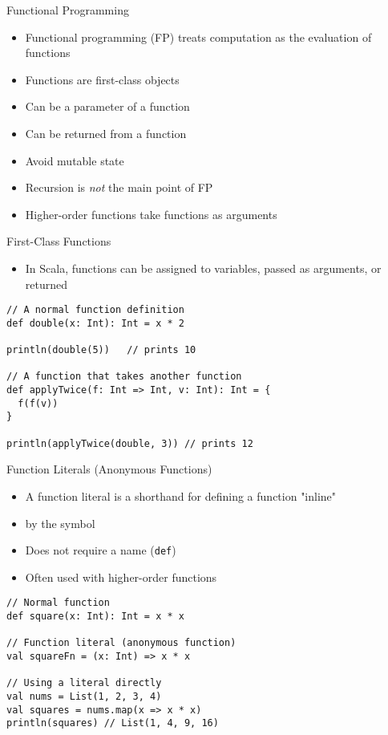 \begin{frame}[fragile]{Functional Programming}
\begin{itemize}
\item Functional programming (FP) treats computation as the evaluation of functions
\item Functions are first-class objects
\item Can be a parameter of a function
\item Can be returned from a function
\item Avoid mutable state
\item Recursion is \emph{not} the main point of FP
\item Higher-order functions take functions as arguments
\end{itemize}
\end{frame}


\begin{frame}[fragile]{First-Class Functions}
\begin{itemize}
    \item In Scala, functions can be assigned to variables, passed as arguments, or returned
\end{itemize}

\begin{verbatim}
// A normal function definition
def double(x: Int): Int = x * 2

println(double(5))   // prints 10

// A function that takes another function
def applyTwice(f: Int => Int, v: Int): Int = {
  f(f(v))
}

println(applyTwice(double, 3)) // prints 12
\end{verbatim}
\end{frame}

\begin{frame}[fragile]{Function Literals (Anonymous Functions)}
\begin{itemize}
    \item A function literal is a shorthand for defining a function "inline"
    \item by the \code{=>} symbol
    \item Does not require a name (\texttt{def})
    \item Often used with higher-order functions
\end{itemize}

\begin{verbatim}
// Normal function
def square(x: Int): Int = x * x

// Function literal (anonymous function)
val squareFn = (x: Int) => x * x

// Using a literal directly
val nums = List(1, 2, 3, 4)
val squares = nums.map(x => x * x)
println(squares) // List(1, 4, 9, 16)
\end{verbatim}
\end{frame}

